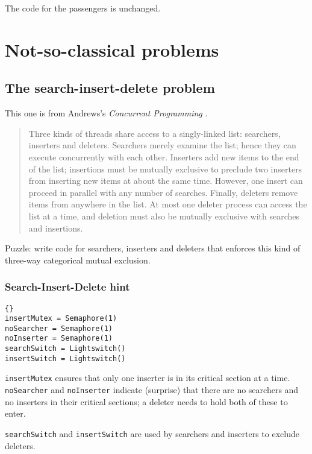 \documentclass{book}
\newcommand{\clearemptydoublepage}{\newpage\cleardoublepage}
\begin{document}
The code for the passengers is unchanged.


\clearemptydoublepage
\chapter{Not-so-classical problems}

\section{The search-insert-delete problem}

This one is from Andrews's {\em Concurrent Programming} \cite{andrews}.

\begin {quotation}
Three kinds of threads share access to a singly-linked list:
searchers, inserters and deleters.  Searchers merely examine the list;
hence they can execute concurrently with each other.  Inserters add
new items to the end of the list; insertions must be mutually
exclusive to preclude two inserters from inserting new items at about
the same time.  However, one insert can proceed in parallel with any
number of searches.  Finally, deleters remove items from anywhere in
the list.  At most one deleter process can access the list at a time,
and deletion must also be mutually exclusive with searches and
insertions.
\end{quotation}

Puzzle: write code for searchers, inserters and deleters that
enforces this kind of three-way categorical mutual exclusion.


\clearemptydoublepage
\subsection{Search-Insert-Delete hint}

\begin{lstlisting}[title={Search-Insert-Delete hint}]{}
insertMutex = Semaphore(1)
noSearcher = Semaphore(1)
noInserter = Semaphore(1)
searchSwitch = Lightswitch()
insertSwitch = Lightswitch()
\end{lstlisting}

{\tt insertMutex} ensures that only one inserter is in its critical
section at a time.  {\tt noSearcher} and {\tt noInserter} indicate
(surprise) that there are no searchers and no inserters in their
critical sections; a deleter needs to hold both of these to enter.

{\tt searchSwitch} and {\tt insertSwitch} are used by searchers and
inserters to exclude deleters.
\end{document}
